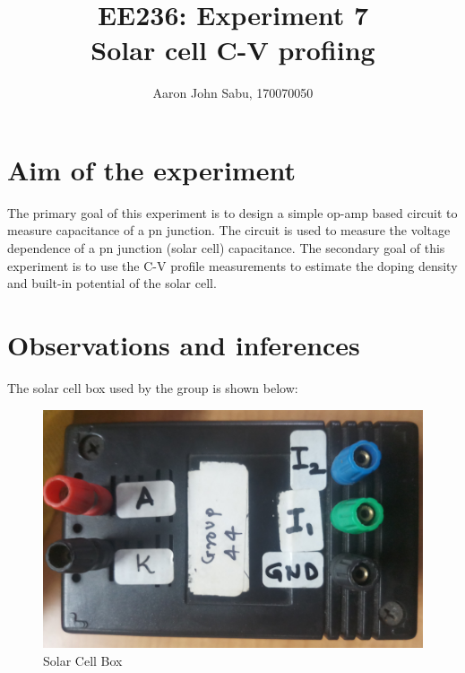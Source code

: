 \documentclass[12pt]{article}
\title{EE236: Experiment 7\\
Solar cell C-V profiing}
\author{Aaron John Sabu, 170070050}
\begin{document}
\maketitle

\section{Aim of the experiment}

The primary goal of this experiment is to design a simple op-amp based circuit to measure capacitance of a pn junction. The circuit is used to measure the voltage dependence of a pn junction (solar cell) capacitance. The secondary goal of this experiment is to use the C-V profile measurements to estimate the doping density and built-in potential of the solar cell.

\section{Observations and inferences}

The solar cell box used by the group is shown below:
\begin{figure}[H]
	\centering
	\includegraphics[scale=0.06]{SolarCellBox.jpg}
	\caption{Solar Cell Box}
\end{figure}
\end{document}
